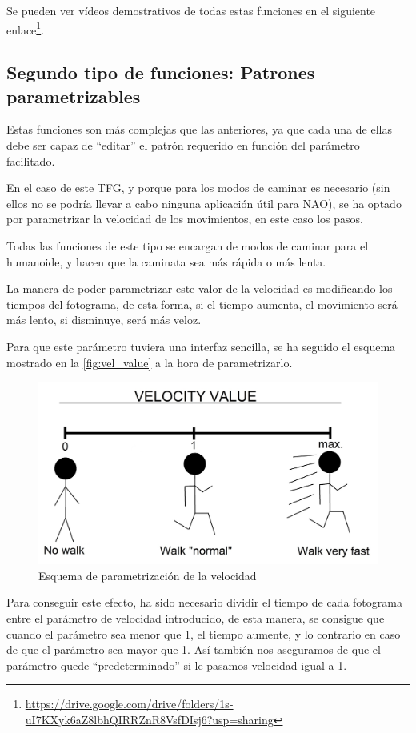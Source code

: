 Se pueden ver vídeos demostrativos de todas estas funciones en el siguiente enlace\footnote{\url{https://drive.google.com/drive/folders/1s-uI7KXyk6aZ8lbhQIRRZnR8VsfDIsj6?usp=sharing}}.

\subsection{Segundo tipo de funciones: Patrones parametrizables}

Estas funciones son más complejas que las anteriores, ya que cada una de ellas debe ser capaz de ``editar'' el patrón requerido en función del parámetro facilitado.

En el caso de este TFG, y porque para los modos de caminar es necesario (sin ellos no se podría llevar a cabo ninguna aplicación útil para NAO), se ha optado por parametrizar la velocidad de los movimientos, en este caso los pasos.

Todas las funciones de este tipo se encargan de modos de caminar para el humanoide, y hacen que la caminata sea más rápida o más lenta.

La manera de poder parametrizar este valor de la velocidad es modificando los tiempos del fotograma, de esta forma, si el tiempo aumenta, el movimiento será más lento, si disminuye, será más veloz.

Para que este parámetro tuviera una interfaz sencilla, se ha seguido el esquema mostrado en la \autoref{fig:vel_value} a la hora de parametrizarlo.

\begin{figure}[H]
  \centering
  \includegraphics[width=1\textwidth]{figures/cap_4/velocity_value.jpeg}
  \caption{Esquema de parametrización de la velocidad}
  \label{fig:vel_value}
\end{figure}

Para conseguir este efecto, ha sido necesario dividir el tiempo de cada fotograma entre el parámetro de velocidad introducido, de esta manera, se consigue que cuando el parámetro sea menor que 1, el tiempo aumente, y lo contrario en caso de que el parámetro sea mayor que 1. Así también nos aseguramos de que el parámetro quede ``predeterminado'' si le pasamos velocidad igual a 1.

